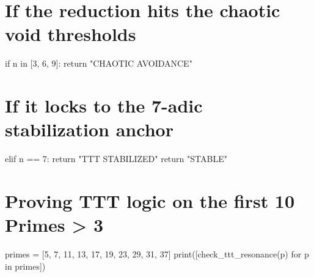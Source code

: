 {{{{{{    \section{If the reduction hits the chaotic void thresholds}
    if n in [3, 6, 9]: return "CHAOTIC AVOIDANCE"
    \section{If it locks to the 7-adic stabilization anchor}
    elif n == 7: return "TTT STABILIZED"
    return "STABLE"

\section{Proving TTT logic on the first 10 Primes > 3}
primes = [5, 7, 11, 13, 17, 19, 23, 29, 31, 37]
print([check_ttt_resonance(p) for p in primes])
}}}}}}
